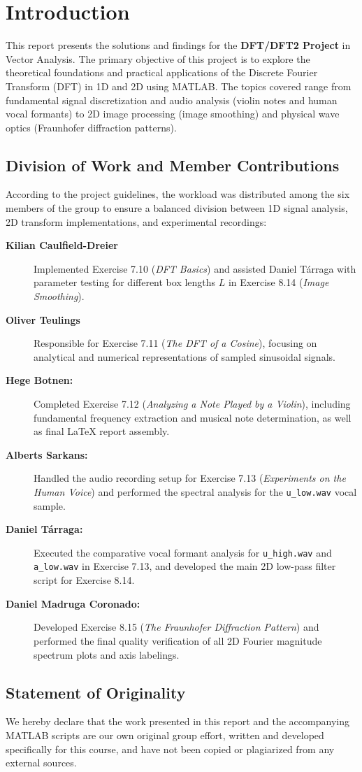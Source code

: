 \section{Introduction} 
This report presents the solutions and findings for the \textbf{DFT/DFT2 Project} in Vector Analysis. The primary objective of this project is to explore the theoretical foundations and practical applications of the Discrete Fourier Transform (DFT) in 1D and 2D using MATLAB. The topics covered range from fundamental signal discretization and audio analysis (violin notes and human vocal formants) to 2D image processing (image smoothing) and physical wave optics (Fraunhofer diffraction patterns). 

\subsection{Division of Work and Member Contributions} According to the project guidelines, the workload was distributed among the six members of the group to ensure a balanced division between 1D signal analysis, 2D transform implementations, and experimental recordings: 

\begin{description}
    
\item[\textbf{Kilian Caulfield-Dreier}] 
Implemented Exercise 7.10 (\textit{DFT Basics}) and assisted Daniel Tárraga with parameter testing for different box lengths $L$ in Exercise 8.14 (\textit{Image Smoothing}).
\item[\textbf{Oliver Teulings}] 
Responsible for Exercise 7.11 (\textit{The DFT of a Cosine}), focusing on analytical and numerical representations of sampled sinusoidal signals. 
\item[\textbf{Hege Botnen:}] 
Completed Exercise 7.12 (\textit{Analyzing a Note Played by a Violin}), including fundamental frequency extraction and musical note determination, as well as final LaTeX report assembly. 
\item[\textbf{Alberts Sarkans:}] 
Handled the audio recording setup for Exercise 7.13 (\textit{Experiments on the Human Voice}) and performed the spectral analysis for the \texttt{u\_low.wav} vocal sample.
\item[\textbf{Daniel Tárraga:}] 
Executed the comparative vocal formant analysis for \texttt{u\_high.wav} and \texttt{a\_low.wav} in Exercise 7.13, and developed the main 2D low-pass filter script for Exercise 8.14. 
\item[\textbf{Daniel Madruga Coronado:}] 
Developed Exercise 8.15 (\textit{The Fraunhofer Diffraction Pattern}) and performed the final quality verification of all 2D Fourier magnitude spectrum plots and axis labelings. 

\end{description}

\subsection{Statement of Originality} We hereby declare that the work presented in this report and the accompanying MATLAB scripts are our own original group effort, written and developed specifically for this course, and have not been copied or plagiarized from any external sources.
